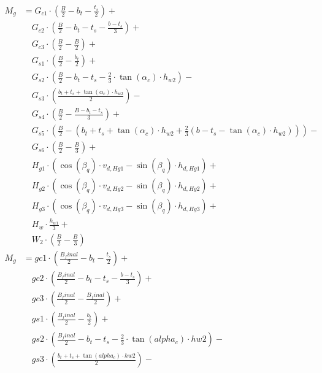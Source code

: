 \documentclass[a4paper, 11pt]{article}
\begin{document}
\begin{align*}
M_{g} &= G_{c1} \cdot \left( \frac{B}{2} - b_{t} - \frac{t_{s}}{2} \right) +  \\
   &\quad G_{c2} \cdot \left( \frac{B}{2} - b_{t} - t_{s} - \frac{b - t_{s}}{3} \right) + \\
   &\quad G_{c3} \cdot \left( \frac{B}{2} - \frac{B}{2} \right) + \\
   &\quad G_{s1} \cdot \left( \frac{B}{2} - \frac{b_{t}}{2} \right) + \\
   &\quad G_{s2} \cdot \left( \frac{B}{2} - b_{t} - t_{s} - \frac{2}{3} \cdot \tan (\alpha_{c}) \cdot h_{w2} \right) - \\
   &\quad G_{s3} \cdot \left( \frac{b_{t} + t_{s} + \tan (\alpha_{c}) \cdot h_{w2}}{2}  \right) - \\
   &\quad G_{s4} \cdot \left( \frac{B}{2} - \frac{B - b_{t} - t_{s}}{3} \right) + \\
   &\quad G_{s5} \cdot \left( \frac{B}{2} - \left(b_{t} + t_{s} + \tan(\alpha_{c}) \cdot h_{w2} + \frac{2}{3} \left(b - t_{s} - \tan(\alpha_{c}) \cdot h_{w2} \right)\right) \right) - \\
   &\quad G_{s6} \cdot \left( \frac{B}{2} - \frac{B}{3} \right) + \\
   &\quad H_{g1} \cdot  \left( \cos (\beta_{q}) \cdot v_{d,Hg1} -  \sin (\beta_{q}) \cdot h_{d,Hg1} \right) + \\
   &\quad H_{g2} \cdot \left( \cos (\beta_{q}) \cdot v_{d,Hg2} -  \sin (\beta_{q}) \cdot h_{d,Hg2} \right) +  \\
   &\quad H_{g3} \cdot \left( \cos (\beta_{q}) \cdot v_{d,Hg3} -  \sin (\beta_{q}) \cdot h_{d,Hg3} \right) +  \\
   &\quad H_{w} \cdot \frac{h_{w1}}{3} + \\
   &\quad W_2 \cdot \left( \frac{B}{2} - \frac{B}{3} \right) \\
M_{g} &= gc1 \cdot \left( \frac{B_final}{2} - b_t - \frac{t_s}{2} \right) +  \\
   &\quad gc2 \cdot \left( \frac{B_final}{2} - b_t - t_s - \frac{b - t_s}{3} \right) + \\
   &\quad gc3 \cdot \left( \frac{B_final}{2} - \frac{B_final}{2} \right) + \\
   &\quad gs1 \cdot \left( \frac{B_final}{2} - \frac{b_t}{2} \right) + \\
   &\quad gs2 \cdot \left( \frac{B_final}{2} - b_t - t_s - \frac{2}{3} \cdot \tan (alpha_c) \cdot hw2 \right) - \\
   &\quad gs3 \cdot \left( \frac{b_t + t_s + \tan (alpha_c) \cdot hw2}{2}  \right) - \\

\end{align*}
\end{document}
